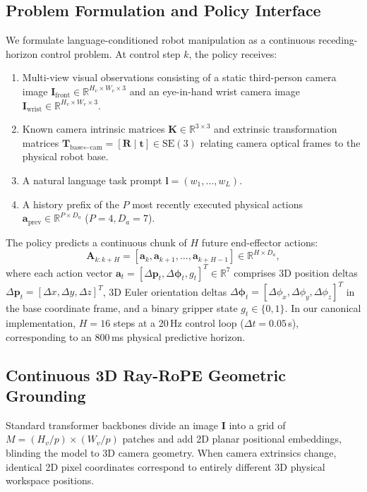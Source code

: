 \subsection{Problem Formulation and Policy Interface}
We formulate language-conditioned robot manipulation as a continuous receding-horizon control problem. At control step $k$, the policy receives:
\begin{enumerate}
    \item Multi-view visual observations consisting of a static third-person camera image $\mathbf{I}_{\text{front}} \in \mathbb{R}^{H_v \times W_v \times 3}$ and an eye-in-hand wrist camera image $\mathbf{I}_{\text{wrist}} \in \mathbb{R}^{H_v \times W_v \times 3}$.
    \item Known camera intrinsic matrices $\mathbf{K} \in \mathbb{R}^{3 \times 3}$ and extrinsic transformation matrices $\mathbf{T}_{\text{base}\leftarrow\text{cam}} = [\mathbf{R} \mid \mathbf{t}] \in \text{SE}(3)$ relating camera optical frames to the physical robot base.
    \item A natural language task prompt $\mathbf{l} = (w_1, \dots, w_L)$.
    \item A history prefix of the $P$ most recently executed physical actions $\mathbf{a}_{\text{prev}} \in \mathbb{R}^{P \times D_a}$ ($P=4, D_a=7$).
\end{enumerate}

The policy predicts a continuous chunk of $H$ future end-effector actions:
\begin{equation}
\mathbf{A}_{k:k+H} = [\mathbf{a}_k, \mathbf{a}_{k+1}, \dots, \mathbf{a}_{k+H-1}] \in \mathbb{R}^{H \times D_a},
\end{equation}
where each action vector $\mathbf{a}_t = [\Delta \mathbf{p}_t, \Delta \boldsymbol{\phi}_t, g_t]^T \in \mathbb{R}^7$ comprises 3D position deltas $\Delta \mathbf{p}_t = [\Delta x, \Delta y, \Delta z]^T$, 3D Euler orientation deltas $\Delta \boldsymbol{\phi}_t = [\Delta \phi_x, \Delta \phi_y, \Delta \phi_z]^T$ in the base coordinate frame, and a binary gripper state $g_t \in \{0, 1\}$. In our canonical implementation, $H=16$ steps at a 20\,Hz control loop ($\Delta t = 0.05$\,s), corresponding to an 800\,ms physical predictive horizon.

\subsection{Continuous 3D Ray-RoPE Geometric Grounding}
Standard transformer backbones divide an image $\mathbf{I}$ into a grid of $M = (H_v/p) \times (W_v/p)$ patches and add 2D planar positional embeddings, blinding the model to 3D camera geometry. When camera extrinsics change, identical 2D pixel coordinates correspond to entirely different 3D physical workspace positions.

